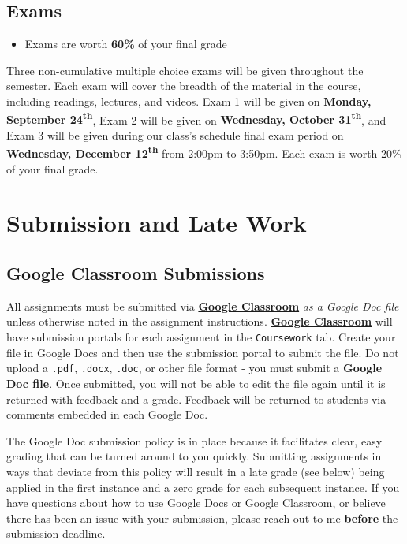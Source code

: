 \documentclass[]{book}
\newenvironment{rmdblock}[1]
  {\begin{shaded*}
  \begin{itemize}
  \renewcommand{\labelitemi}{
    \raisebox{-.7\height}[0pt][0pt]{
      {\setkeys{Gin}{width=3em,keepaspectratio}\texttt{[image: images/\#1]}}
    }
  }
  \item
  }
  {
  \end{itemize}
  \end{shaded*}
  }
\newenvironment{rmdtip}
  {\begin{rmdblock}{tip}}
  {\end{rmdblock}}
\theoremstyle{definition}
\theoremstyle{definition}
\theoremstyle{definition}
\theoremstyle{remark}
\begin{document}
\hypertarget{exams}{%
\subsection{Exams}\label{exams}}

\begin{rmdtip}
Exams are worth \textbf{60\%} of your final grade
\end{rmdtip}

Three non-cumulative multiple choice exams will be given throughout the
semester. Each exam will cover the breadth of the material in the
course, including readings, lectures, and videos. Exam 1 will be given
on \textbf{Monday, September 24\textsuperscript{th}}, Exam 2 will be
given on \textbf{Wednesday, October 31\textsuperscript{th}}, and Exam 3
will be given during our class's schedule final exam period on
\textbf{Wednesday, December 12\textsuperscript{th}} from 2:00pm to
3:50pm. Each exam is worth 20\% of your final grade.

\hypertarget{submission-and-late-work}{%
\section{Submission and Late Work}\label{submission-and-late-work}}

\hypertarget{google-classroom-submissions}{%
\subsection{Google Classroom
Submissions}\label{google-classroom-submissions}}

All assignments must be submitted via
\textbf{\href{https://classroom.google.com}{Google Classroom}} \emph{as
a Google Doc file} unless otherwise noted in the assignment
instructions. \textbf{\href{https://classroom.google.com}{Google
Classroom}} will have submission portals for each assignment in the
\texttt{Coursework} tab. Create your file in Google Docs and then use
the submission portal to submit the file. Do not upload a \texttt{.pdf},
\texttt{.docx}, \texttt{.doc}, or other file format - you must submit a
\textbf{Google Doc file}. Once submitted, you will not be able to edit
the file again until it is returned with feedback and a grade. Feedback
will be returned to students via comments embedded in each Google Doc.

The Google Doc submission policy is in place because it facilitates
clear, easy grading that can be turned around to you quickly. Submitting
assignments in ways that deviate from this policy will result in a late
grade (see below) being applied in the first instance and a zero grade
for each subsequent instance. If you have questions about how to use
Google Docs or Google Classroom, or believe there has been an issue with
your submission, please reach out to me \textbf{before} the submission
deadline.
\end{document}
